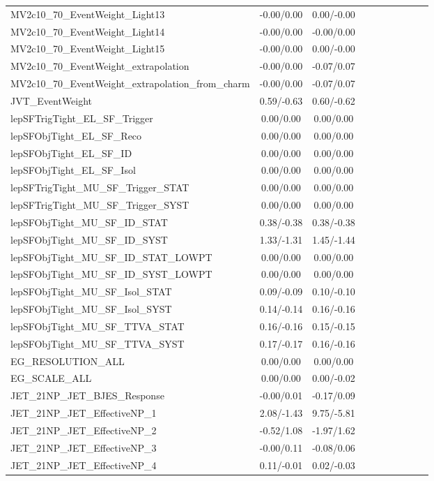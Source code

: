 \begin{table}[h]
\begin{center}
\begin{tabular}{l|ccccccccc}
MV2c10\_70\_EventWeight\_Light13 &-0.00/0.00 &0.00/-0.00 \\
MV2c10\_70\_EventWeight\_Light14 &-0.00/0.00 &-0.00/0.00 \\
MV2c10\_70\_EventWeight\_Light15 &-0.00/0.00 &0.00/-0.00 \\
MV2c10\_70\_EventWeight\_extrapolation &-0.00/0.00 &-0.07/0.07 \\
MV2c10\_70\_EventWeight\_extrapolation\_from\_charm &-0.00/0.00 &-0.07/0.07 \\
JVT\_EventWeight &0.59/-0.63 &0.60/-0.62 \\
lepSFTrigTight\_EL\_SF\_Trigger &0.00/0.00 &0.00/0.00 \\
lepSFObjTight\_EL\_SF\_Reco &0.00/0.00 &0.00/0.00 \\
lepSFObjTight\_EL\_SF\_ID &0.00/0.00 &0.00/0.00 \\
lepSFObjTight\_EL\_SF\_Isol &0.00/0.00 &0.00/0.00 \\
lepSFTrigTight\_MU\_SF\_Trigger\_STAT &0.00/0.00 &0.00/0.00 \\
lepSFTrigTight\_MU\_SF\_Trigger\_SYST &0.00/0.00 &0.00/0.00 \\
lepSFObjTight\_MU\_SF\_ID\_STAT &0.38/-0.38 &0.38/-0.38 \\
lepSFObjTight\_MU\_SF\_ID\_SYST &1.33/-1.31 &1.45/-1.44 \\
lepSFObjTight\_MU\_SF\_ID\_STAT\_LOWPT &0.00/0.00 &0.00/0.00 \\
lepSFObjTight\_MU\_SF\_ID\_SYST\_LOWPT &0.00/0.00 &0.00/0.00 \\
lepSFObjTight\_MU\_SF\_Isol\_STAT &0.09/-0.09 &0.10/-0.10 \\
lepSFObjTight\_MU\_SF\_Isol\_SYST &0.14/-0.14 &0.16/-0.16 \\
lepSFObjTight\_MU\_SF\_TTVA\_STAT &0.16/-0.16 &0.15/-0.15 \\
lepSFObjTight\_MU\_SF\_TTVA\_SYST &0.17/-0.17 &0.16/-0.16 \\
EG\_RESOLUTION\_ALL &0.00/0.00 &0.00/0.00 \\
EG\_SCALE\_ALL &0.00/0.00 &0.00/-0.02 \\
JET\_21NP\_JET\_BJES\_Response &-0.00/0.01 &-0.17/0.09 \\
JET\_21NP\_JET\_EffectiveNP\_1 &2.08/-1.43 &9.75/-5.81 \\
JET\_21NP\_JET\_EffectiveNP\_2 &-0.52/1.08 &-1.97/1.62 \\
JET\_21NP\_JET\_EffectiveNP\_3 &-0.00/0.11 &-0.08/0.06 \\
JET\_21NP\_JET\_EffectiveNP\_4 &0.11/-0.01 &0.02/-0.03 \\

\end{tabular}
\end{center}
\end{table}
